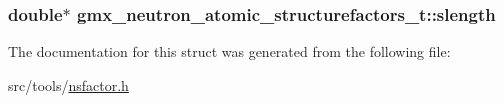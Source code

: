 \hypertarget{structgmx__neutron__atomic__structurefactors__t_a42338605492094d62b1ed2c1028e8126}{
\subsubsection[{slength}]{\setlength{\rightskip}{0pt plus 5cm}double$\ast$ {\bf gmx\-\_\-neutron\-\_\-atomic\-\_\-structurefactors\-\_\-t\-::slength}}}\label{structgmx__neutron__atomic__structurefactors__t_a42338605492094d62b1ed2c1028e8126}


\-The documentation for this struct was generated from the following file\-:\begin{DoxyCompactItemize}
\item 
src/tools/\hyperlink{nsfactor_8h}{nsfactor.\-h}\end{DoxyCompactItemize}
